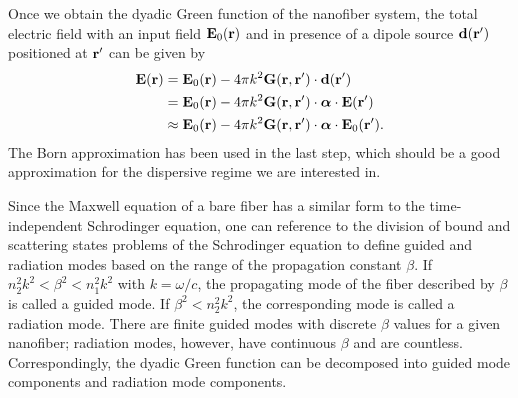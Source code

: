 \documentclass[preprint,aps,pra,onecolumn]{revtex4-1} %
\begin{document}
Once we obtain the dyadic Green function of the nanofiber system, the total electric field with an input field $\mathbf{E}_0(\mathbf{r})$ and in presence of a dipole source $\mathbf{d}(\mathbf{r}')$ positioned at $\mathbf{r}'$ can be given by
\begin{align}
\mathbf{E}(\mathbf{r}) &= \mathbf{E}_0(\mathbf{r})-4\pi k^2\mathbf{G}(\mathbf{r},\mathbf{r}')\cdot \mathbf{d}(\mathbf{r}')\\
&=\mathbf{E}_0(\mathbf{r})-4\pi k^2 \mathbf{G}(\mathbf{r},\mathbf{r}')\cdot \boldsymbol{\alpha}\cdot \mathbf{E}(\mathbf{r}')\\
&\approx \mathbf{E}_0(\mathbf{r})-4\pi k^2 \mathbf{G}(\mathbf{r},\mathbf{r}')\cdot \boldsymbol{\alpha}\cdot \mathbf{E}_0(\mathbf{r}').
\end{align}
The Born approximation has been used in the last step, which should be a good approximation for the dispersive regime we are interested in. 

Since the Maxwell equation of a bare fiber has a similar form to the time-independent Schrodinger equation, one can reference to the division of bound and scattering states problems of the Schrodinger equation to define guided and radiation modes based on the range of the propagation constant $ \beta $. If $ n_2^2k^2<\beta^2<n_1^2k^2 $ with $ k=\omega/c $, the propagating mode of the fiber described by $ \beta $ is called a guided mode. If $ \beta^2<n_2^2k^2 $, the corresponding mode is called a radiation mode. There are finite guided modes with discrete $ \beta $ values for a given nanofiber; radiation modes, however, have continuous $ \beta $ and are countless. Correspondingly, the dyadic Green function can be decomposed into guided mode components and radiation mode components.    
\end{document}
